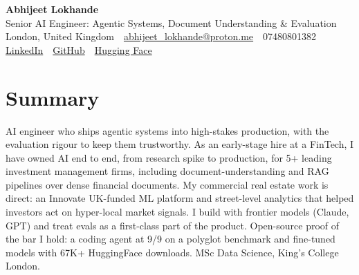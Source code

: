 \documentclass[10pt,a4paper]{article}
\newcommand{\sep}{\,\textcolor{accent!60}{\textbar}\,}
\begin{document}
\begin{center}
  {\fontsize{24}{26}\selectfont\bfseries Abhijeet Lokhande}\\[3pt]
  {\color{accent}\large Senior AI Engineer: Agentic Systems, Document Understanding \& Evaluation}\\[5pt]
  {\small
    London, United Kingdom \sep
    \href{mailto:abhijeet_lokhande@proton.me}{abhijeet\_lokhande@proton.me} \sep
    07480801382 \\[2pt]
    \href{https://www.linkedin.com/in/ablds/}{LinkedIn} \sep
    \href{https://github.com/abhijeetscode}{GitHub} \sep
    \href{https://huggingface.co/ab-ai}{Hugging Face}
  }
\end{center}
\vspace{2pt}

\section{Summary}
AI engineer who ships agentic systems into high-stakes production, with the evaluation rigour to keep them trustworthy. As an early-stage hire at a FinTech, I have owned AI end to end, from research spike to production, for 5+ leading investment management firms, including document-understanding and RAG pipelines over dense financial documents. My commercial real estate work is direct: an Innovate UK-funded ML platform and street-level analytics that helped investors act on hyper-local market signals. I build with frontier models (Claude, GPT) and treat evals as a first-class part of the product. Open-source proof of the bar I hold: a coding agent at 9/9 on a polyglot benchmark and fine-tuned models with 67K+ HuggingFace downloads. MSc Data Science, King's College London.

\end{document}
